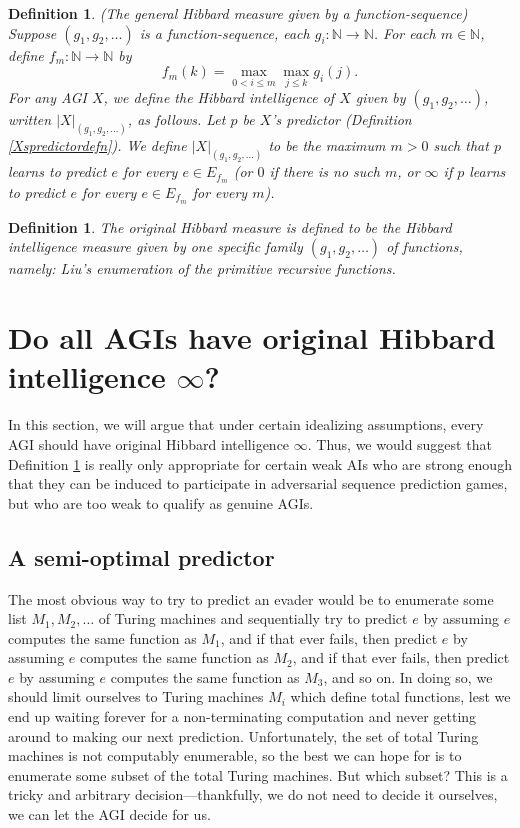 \documentclass{article}
\newtheorem{definition}[theorem]{Definition}
\begin{document}
\begin{definition}
\label{generalintelligencemeasuredefn}
    (The general Hibbard measure given by a function-sequence)
    Suppose $(g_1,g_2,\ldots)$ is a function-sequence,
    each $g_i:\mathbb N\to\mathbb N$.
    For each $m\in\mathbb N$, define $f_m:\mathbb N\to\mathbb N$ by
    \[f_m(k)=\max_{0<i\leq m}\max_{j\leq k}g_i(j).\]
    For any AGI $X$, we define the \emph{Hibbard intelligence of $X$
    given by $(g_1,g_2,\ldots)$}, written $|X|_{(g_1,g_2,\ldots)}$, as follows.
    Let $p$ be $X$'s predictor (Definition \ref{Xspredictordefn}).
    We define $|X|_{(g_1,g_2,\ldots)}$ to be the maximum $m>0$
    such that $p$ learns to predict $e$ for every $e\in E_{f_m}$
    (or $0$ if there is no such $m$, or $\infty$ if $p$ learns to predict $e$
    for every $e\in E_{f_m}$ for every $m$).
\end{definition}

\begin{definition}
\label{classichibbardmeasuredefn}
    The \emph{original Hibbard measure} is defined to be the Hibbard intelligence
    measure given by one specific family $(g_1,g_2,\ldots)$ of functions, namely:
    Liu's \cite{liu1960enumeration} enumeration of the primitive recursive
    functions.
\end{definition}


\section{Do all AGIs have original Hibbard intelligence $\infty$?}
\label{trivialitysection}

In this section, we will argue that under certain idealizing
assumptions, every AGI should have original Hibbard intelligence $\infty$.
Thus, we would suggest that Definition \ref{classichibbardmeasuredefn} is really
only appropriate for certain weak AIs who are strong enough that they can be
induced to participate in adversarial sequence prediction games, but who are
too weak to qualify as genuine AGIs.


\subsection{A semi-optimal predictor}
\label{semioptimalpredictorsubsection}

The most obvious way to try to predict an evader would be to
enumerate some list $M_1,M_2,\ldots$ of Turing machines and
sequentially try to predict $e$ by assuming $e$ computes the same
function as $M_1$, and if that ever fails, then predict $e$ by
assuming $e$ computes the same function as $M_2$, and if that ever
fails, then predict $e$ by assuming $e$ computes the same function
as $M_3$, and so on. In doing so, we should limit ourselves
to Turing machines $M_i$ which define total functions, lest
we end up waiting forever for a non-terminating computation
and never getting around to making our next
prediction. Unfortunately, the set of total Turing machines is
not computably enumerable, so the best we can hope for is to enumerate
some subset of the total Turing machines. But which subset? This is
a tricky and arbitrary decision---thankfully, we do not need to
decide it ourselves, we can let the AGI decide for us.
\end{document}
